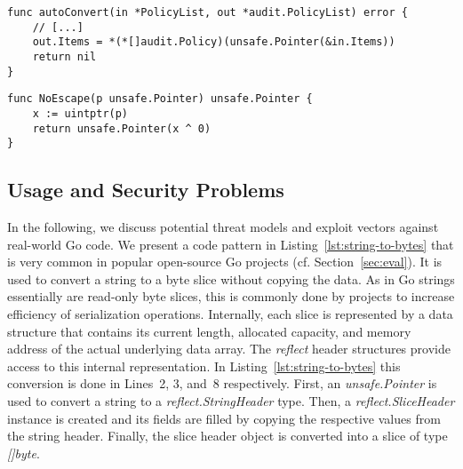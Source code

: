 \begin{lstlisting}[language=Golang, label=lst:unsafe-ex-in-place-cast, caption=In-place cast using the \unsafe{} package
from the Kubernetes \textit{k8s.io/apiserver} module with minor changes.
,float, belowskip=-1.5em, aboveskip=0em]
func autoConvert(in *PolicyList, out *audit.PolicyList) error {
	// [...]
	out.Items = *(*[]audit.Policy)(unsafe.Pointer(&in.Items))
	return nil
}
\end{lstlisting}

\begin{lstlisting}[language=Golang, label=lst:unsafe-ex-escape-analysis, caption=Hiding a value from escape analysis from the \textit{modern-go/reflect2} module.
, float, belowskip=-1.5em]
func NoEscape(p unsafe.Pointer) unsafe.Pointer {
	x := uintptr(p)
	return unsafe.Pointer(x ^ 0)
}
\end{lstlisting}







\subsection{Usage and Security Problems}
\label{sec:appr:vulnerabilites}

In the following, we discuss potential threat models and exploit vectors against real-world \unsafe{} Go code.
We present a code pattern in Listing~\ref{lst:string-to-bytes} that is very common in popular open-source Go projects (cf. Section~\ref{sec:eval}).
It is used to convert a string to a byte slice without copying the data.
As in Go strings essentially are read-only byte slices, this is commonly done by projects to increase efficiency of serialization operations. %
Internally, each slice is represented by a data structure that contains its current length, allocated capacity, and memory address of the actual underlying data array.
The \textit{reflect} header structures provide access to this internal representation.
In Listing~\ref{lst:string-to-bytes} this conversion is done in Lines~2, 3, and~8 respectively.
First, an \textit{unsafe.Pointer} is used to convert a string to a \textit{reflect.StringHeader} type.
Then, a \textit{reflect.SliceHeader} instance is created and its fields are filled by copying the respective values from the string header.
Finally, the slice header object is converted into a slice of type \textit{[]byte}.

